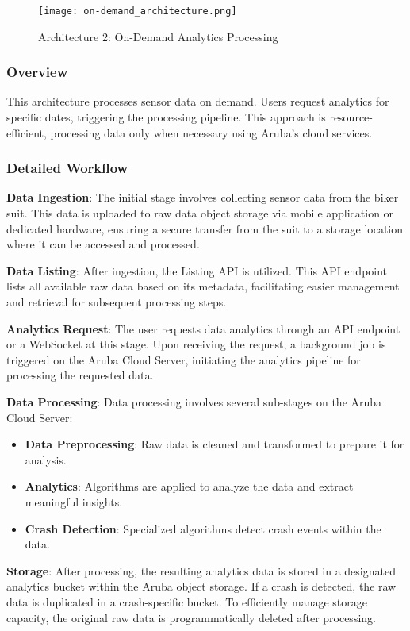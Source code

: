 \begin{figure}[htbp]
    \centering
    \texttt{[image: on-demand\_architecture.png]}
    \caption{Architecture 2: On-Demand Analytics Processing}
\end{figure}

\subsubsection{Overview}
This architecture processes sensor data on demand. Users request analytics for specific dates, triggering the processing pipeline. This approach is resource-efficient, processing data only when necessary using Aruba's cloud services.

\subsubsection{Detailed Workflow}

\textbf{Data Ingestion}:  
The initial stage involves collecting sensor data from the biker suit. This data is uploaded to raw data object storage via mobile application or dedicated hardware, ensuring a secure transfer from the suit to a storage location where it can be accessed and processed.

\textbf{Data Listing}:  
After ingestion, the Listing API is utilized. This API endpoint lists all available raw data based on its metadata, facilitating easier management and retrieval for subsequent processing steps.

\textbf{Analytics Request}:  
The user requests data analytics through an API endpoint or a WebSocket at this stage. Upon receiving the request, a background job is triggered on the Aruba Cloud Server, initiating the analytics pipeline for processing the requested data.

\textbf{Data Processing}:  
Data processing involves several sub-stages on the Aruba Cloud Server:
\begin{itemize}
    \item \textbf{Data Preprocessing}: Raw data is cleaned and transformed to prepare it for analysis.
    \item \textbf{Analytics}: Algorithms are applied to analyze the data and extract meaningful insights.
    \item \textbf{Crash Detection}: Specialized algorithms detect crash events within the data.
\end{itemize}

\textbf{Storage}:  
After processing, the resulting analytics data is stored in a designated analytics bucket within the Aruba object storage. If a crash is detected, the raw data is duplicated in a crash-specific bucket. To efficiently manage storage capacity, the original raw data is programmatically deleted after processing.

